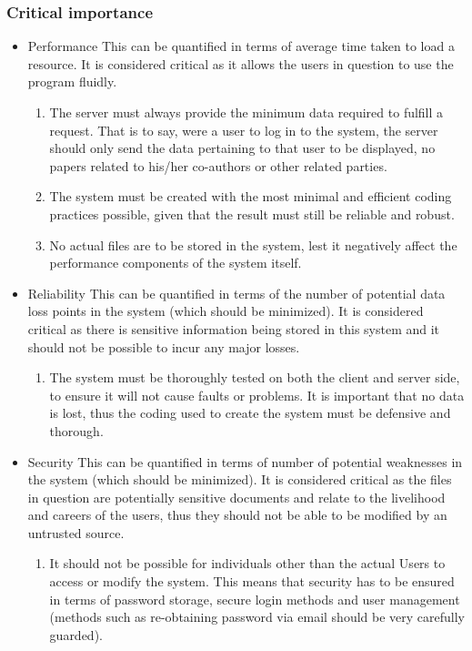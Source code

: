 \documentclass[hidelinks,a4paper,12pt]{article}
\begin{document}
			\subsubsection{Critical importance}
			\begin{itemize}
				\item Performance
				This can be quantified in terms of average time taken to load a resource. It is considered critical as it allows the users in question to use the program fluidly.
				\begin{enumerate}
					\item The server must always provide the minimum data required to fulfill a request. That is to say, were a user to log in to the system, the server should only send the data pertaining to that user to be displayed, no papers related to his/her co-authors or other related parties. 
					\item The system must be created with the most minimal and efficient coding practices possible, given that the result must still be reliable and robust.
					\item No actual files are to be stored in the system, lest it negatively affect the performance components of the system itself.
				\end{enumerate}
				\item Reliability
				This can be quantified in terms of the number of potential data loss points in the system (which should be minimized). It is considered critical as there is sensitive information being stored in this system and it should not be possible to incur any major losses.
				\begin{enumerate}
					\item The system must be thoroughly tested on both the client and server side, to ensure it will not cause faults or problems. It is important that no data is lost, thus the coding used to create the system must be defensive and thorough.
				\end{enumerate}
				\item Security
				This can be quantified in terms of number of potential weaknesses in the system (which should be minimized). It is considered critical as the files in question are potentially sensitive documents and relate to the livelihood and careers of the users, thus they should not be able to be modified by an untrusted source.
				\begin{enumerate}
					\item It should not be possible for individuals other than the actual Users to access or modify the system. This means that security has to be ensured in terms of password storage, secure login methods and user management (methods such as re-obtaining password via email should be very carefully guarded).

\end{enumerate}
\end{itemize}
\end{document}
